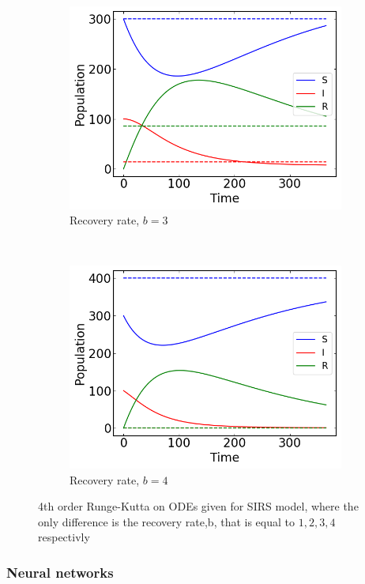 \begin{figure}[H]
\begin{subfigure}{0.49\textwidth}
         \includegraphics[width=\linewidth]{../fig/texfig/RK4_b3T1.png}
         \caption{Recovery rate, $b = 3$}
    \end{subfigure}
     ~ 
    \begin{subfigure}{0.49\textwidth}
         \centering
         \includegraphics[width=\linewidth]{../fig/texfig/RK4_b4T1.png}
         \caption{Recovery rate, $b = 4$}
    \end{subfigure}
    \caption{4th order Runge-Kutta on ODEs given for SIRS model, where the only difference is the recovery rate,b, that is equal to $1,2,3,4$ respectivly}
    \label{fig:4RKSIRS}
\end{figure}

\subsubsection{Neural networks}





